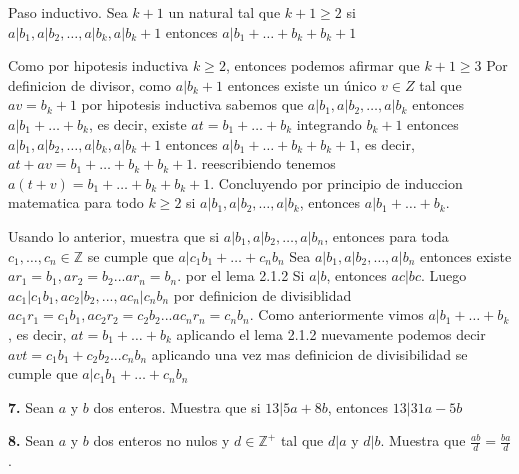 \documentclass[12pt]{article}
\begin{document}
Paso inductivo. Sea $k + 1$ un natural tal que $k + 1 \geq 2$ si $a | b_1, a | b_2, \dots, a | b_k, a | b_k+1$ entonces $a | b_1 + \dots + b_k + b_k+1$

Como por hipotesis inductiva $k \geq 2$, entonces podemos afirmar que $k+1 \geq 3$
Por definicion de divisor, como $a | b_k+1$ entonces existe un único $v \in Z$ tal que $av = b_k+1$
por hipotesis inductiva sabemos que $a | b_1, a | b_2, \dots, a | b_k$ entonces $a | b_1 + \dots + b_k$, es decir, existe $at = b_1 + \dots + b_k$
integrando $b_k+1$ entonces $a | b_1, a | b_2, \dots, a | b_k, a | b_k+1$ entonces $a | b_1 + \dots + b_k + b_k+1$, es decir, $at + av = b_1 + \dots + b_k + b_k+1$.
reescribiendo tenemos $a(t + v) = b_1 + \dots + b_k + b_k+1$.
Concluyendo por principio de induccion matematica  para todo $k \geq 2$ si $a | b_1, a | b_2, \dots, a | b_k$, entonces $a | b_1 + \dots + b_k $.
\vspace{1cm}

Usando lo anterior, muestra que si $a | b_1, a | b_2, \dots, a | b_n$, entonces para toda $c_1, \dots, c_n \in \mathbb{Z}$ se cumple que $a | c_1 b_1 + \dots + c_n b_n$
\vspace{1cm}
Sea $a | b_1, a | b_2, \dots, a | b_n$ entonces existe $ar_1 = b_1 , ar_2 = b_2 ... ar_n = b_n$.
por el lema 2.1.2 Si $a | b$, entonces $ac | bc$. Luego $ac_1 | c_1 b_1, ac_2 | b_2, . . . , ac_n | c_n b_n$ por definicion de divisiblidad $a c_1 r_1 = c_1 b_1 , a c_2 r_2 =  c_2 b_2 ... a c_n r_n = c_n b_n$.
Como anteriormente vimos $a | b_1 + \dots + b_k$, es decir, $at = b_1 + \dots + b_k$ aplicando el lema 2.1.2 nuevamente podemos decir $avt = c_1 b_1 + c_2 b_2 ... c_n b_n$
aplicando una vez mas definicion de divisibilidad
se cumple que $a | c_1 b_1 + \dots + c_n b_n$

%
%
\textbf{7.} Sean $a$ y $b$ dos enteros. Muestra que si $13 | 5a + 8b$, entonces $13|31a - 5b$\\

\vspace{1cm}

%
%
\textbf{8.} Sean $a$ y $b$ dos enteros no nulos y $d \in \mathbb{Z}^+$ tal que $d | a$ y $d | b$. Muestra que $\frac{ab}{d} = \frac{ba}{d}$.

\vspace{1cm}
\end{document}
